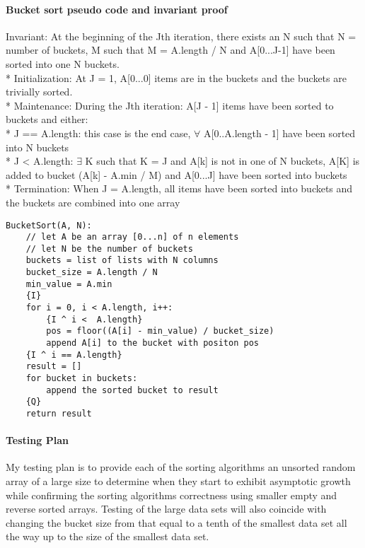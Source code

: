 \documentclass[10pt,letterpaper]{report}
\begin{document}
	\paragraph{Bucket sort pseudo code and invariant proof}
		Invariant: At the beginning of the Jth iteration, there exists an N such that N = number of buckets, M such that M = A.length / N and A[0...J-1] have been sorted into one N buckets. 
		\\* Initialization:  At J = 1, A[0...0] items are in the buckets and the buckets are trivially sorted. 
		\\* Maintenance: During the Jth iteration: A[J - 1] items have been sorted to buckets and either:
		\\* J == A.length: this case is the end case, $ \forall $ A[0..A.length - 1] have been sorted into N buckets
		\\* J < A.length: $ \exists $ K such that K = J and A[k] is not in one of N buckets, A[K] is added to bucket (A[k] - A.min / M) and A[0...J] have been sorted into buckets
		\\* Termination: When J = A.length, all items have been sorted into buckets and the buckets are combined into one array
		\begin{lstlisting}
BucketSort(A, N):
	// let A be an array [0...n] of n elements
	// let N be the number of buckets
	buckets = list of lists with N columns
	bucket_size = A.length / N
	min_value = A.min
	{I}
	for i = 0, i < A.length, i++:
		{I ^ i <  A.length}
		pos = floor((A[i] - min_value) / bucket_size)
		append A[i] to the bucket with positon pos
	{I ^ i == A.length}
	result = []
	for bucket in buckets:
		append the sorted bucket to result
	{Q}
	return result
\end{lstlisting}

\paragraph{Testing Plan}
	My testing plan is to provide each of the sorting algorithms an unsorted random array of a large size to determine when they start to exhibit asymptotic growth while confirming the sorting algorithms correctness using smaller empty and reverse sorted arrays. Testing of the large data sets will also coincide with changing the bucket size from that equal to a tenth of the smallest data set all the way up to the size of the smallest data set. 
\end{document}
